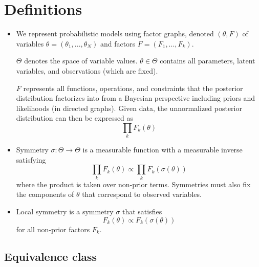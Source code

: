 \documentclass{article}
\begin{document}
\section{Definitions}

\begin{itemize}

\item
We represent probabilistic models using factor graphs, denoted $(\theta,F)$ of variables $\theta=(\theta_1,...,\theta_N)$ and factors $F=(F_1,...,F_k)$.

$\Theta$ denotes the space of variable values. $\theta\in\Theta$ contains all parameters, latent variables, and observations (which are fixed).

$F$ represents all functions, operations, and constraints that the posterior distribution factorizes into from a Bayesian perspective including priors and likelihoods (in directed graphs). Given data, the unnormalized posterior distribution can then be expressed as
\[
\prod_kF_k(\theta)
\]

\item
Symmetry $\sigma:\Theta\rightarrow\Theta$ is a measurable function with a measurable inverse satisfying
\[
\prod_kF_k(\theta)\propto\prod_kF_k\left(\sigma(\theta)\right)
\]
where the product is taken over non-prior terms. Symmetries must also fix the components of $\theta$ that correspond to observed variables.

\item
Local symmetry is a symmetry $\sigma$ that satisfies
\[
F_k(\theta) \propto F_k\left(\sigma(\theta)\right)
\]
for all non-prior factors $F_k$.

\end{itemize}

\subsection{Equivalence class}
\end{document}
